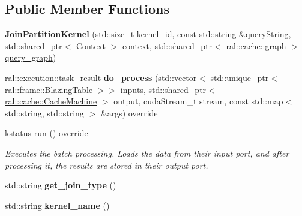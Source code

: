 \subsection*{Public Member Functions}
\begin{DoxyCompactItemize}
\item 
\mbox{\label{classral_1_1batch_1_1JoinPartitionKernel_ab00bc71c00af4f74de196e3da32fd4c8}} 
{\bfseries Join\+Partition\+Kernel} (std\+::size\+\_\+t \hyperlink{classral_1_1cache_1_1kernel_a2fd708656cb056a41ec635b8bdc4acfe}{kernel\+\_\+id}, const std\+::string \&query\+String, std\+::shared\+\_\+ptr$<$ \hyperlink{classblazingdb_1_1manager_1_1Context}{Context} $>$ \hyperlink{classral_1_1cache_1_1kernel_af0347d14d678cfa7205c1387746a2e1b}{context}, std\+::shared\+\_\+ptr$<$ \hyperlink{classral_1_1cache_1_1graph}{ral\+::cache\+::graph} $>$ \hyperlink{classral_1_1cache_1_1kernel_a5fbb02292aff165a28ef25e75f0d89bd}{query\+\_\+graph})
\item 
\mbox{\label{classral_1_1batch_1_1JoinPartitionKernel_a7d12bd8488952a938c26b10e3346928b}} 
\hyperlink{structral_1_1execution_1_1task__result}{ral\+::execution\+::task\+\_\+result} {\bfseries do\+\_\+process} (std\+::vector$<$ std\+::unique\+\_\+ptr$<$ \hyperlink{classral_1_1frame_1_1BlazingTable}{ral\+::frame\+::\+Blazing\+Table} $>$$>$ inputs, std\+::shared\+\_\+ptr$<$ \hyperlink{classral_1_1cache_1_1CacheMachine}{ral\+::cache\+::\+Cache\+Machine} $>$ output, cuda\+Stream\+\_\+t stream, const std\+::map$<$ std\+::string, std\+::string $>$ \&args) override
\item 
kstatus \hyperlink{classral_1_1batch_1_1JoinPartitionKernel_a7c96cd734ef57582b2bd8c2a7a86329e}{run} () override
\begin{DoxyCompactList}\small\item\em Executes the batch processing. Loads the data from their input port, and after processing it, the results are stored in their output port. \end{DoxyCompactList}\item 
\mbox{\label{classral_1_1batch_1_1JoinPartitionKernel_aba8cb636feb452194f2259fffc43e7b1}} 
std\+::string {\bfseries get\+\_\+join\+\_\+type} ()
\item 
\mbox{\label{classral_1_1batch_1_1JoinPartitionKernel_ae29e055fe2769b081fc10b9a91725a16}} 
std\+::string {\bfseries kernel\+\_\+name} ()
\end{DoxyCompactItemize}
